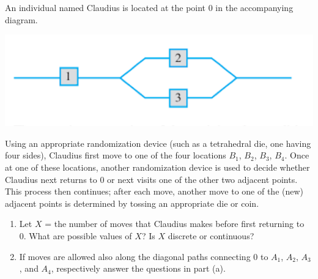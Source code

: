 \documentclass[11pt,letterpaper,boxed]{hmcpset}
\begin{document}
 {



\begin{problem}[3.1.9]
	An individual named Claudius is located at the point 0 in the accompanying diagram.\\
	\begin{center}
		\includegraphics{Nov_3_1.png}
	\end{center}
	Using an appropriate randomization device (such as a tetrahedral die, one having four sides), Claudius first move to one of the four locations $B_1$, $B_2$, $B_3$, $B_4$. Once at one of these locations, another randomization device is used to decide whether Claudius next returns to 0 or next visits one of the other two adjacent points. This process then continues; after each move, another move to one of the (new) adjacent points is determined by tossing an appropriate die or coin.
	\begin{enumerate}
		\item
			Let $X$ = the number of moves that Claudius makes before first returning to 0. What are possible values of $X$? Is $X$ discrete or continuous?
		\item
			If moves are allowed also along the diagonal paths connecting 0 to $A_1$, $A_2$, $A_3$, and $A_4$, respectively answer the questions in part (a).
	\end{enumerate}
\end{problem}

\begin{solution}
	\vfill
\end{solution}
\newpage


}
\end{document}
